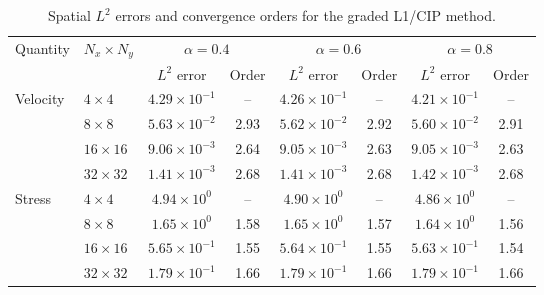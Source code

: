 \documentclass[11pt,a4paper]{article}
\numberwithin{equation}{section}
\renewcommand{\arraystretch}{1.25}
\theoremstyle{plain}
\theoremstyle{definition}
\theoremstyle{remark}
\begin{document}
\begin{table}[htbp]
\centering
\caption{Spatial $L^2$ errors and convergence orders for the graded L1/CIP method.}
\label{tab:ex2-space-cip}
\setlength{\tabcolsep}{4pt}
\renewcommand{\arraystretch}{1.1}
\small
\begin{tabular}{llcc|cc|cc}
\toprule
Quantity & $N_x\times N_y$
& \multicolumn{2}{c|}{$\alpha=0.4$}
& \multicolumn{2}{c|}{$\alpha=0.6$}
& \multicolumn{2}{c}{$\alpha=0.8$} \\
\cmidrule(lr){3-4}
\cmidrule(lr){5-6}
\cmidrule(l){7-8}
& & $L^2$ error & Order
& $L^2$ error & Order
& $L^2$ error & Order \\
\midrule

Velocity & $4\times4$ & $4.29\times10^{-1}$ & -- & $4.26\times10^{-1}$ & -- & $4.21\times10^{-1}$ & -- \\
& $8\times8$ & $5.63\times10^{-2}$ & 2.93 & $5.62\times10^{-2}$ & 2.92 & $5.60\times10^{-2}$ & 2.91 \\
& $16\times16$ & $9.06\times10^{-3}$ & 2.64 & $9.05\times10^{-3}$ & 2.63 & $9.05\times10^{-3}$ & 2.63 \\
& $32\times32$ & $1.41\times10^{-3}$ & 2.68 & $1.41\times10^{-3}$ & 2.68 & $1.42\times10^{-3}$ & 2.68 \\


\addlinespace
Stress & $4\times4$ & $4.94\times10^{0}$ & -- & $4.90\times10^{0}$ & -- & $4.86\times10^{0}$ & -- \\
& $8\times8$ & $1.65\times10^{0}$ & 1.58 & $1.65\times10^{0}$ & 1.57 & $1.64\times10^{0}$ & 1.56 \\
& $16\times16$ & $5.65\times10^{-1}$ & 1.55 & $5.64\times10^{-1}$ & 1.55 & $5.63\times10^{-1}$ & 1.54 \\
& $32\times32$ & $1.79\times10^{-1}$ & 1.66 & $1.79\times10^{-1}$ & 1.66 & $1.79\times10^{-1}$ & 1.66 \\


\end{tabular}
\end{table}
\end{document}
